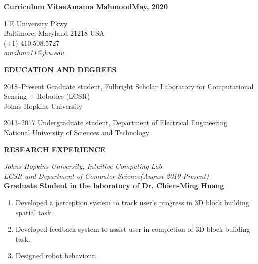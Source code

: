 



\setlength{\parindent}{0pt}

\setlength{\parskip}{6pt}

\frenchspacing

\footnotesize

\textbf{\small Curriculum Vitae\hfill\large Amama Mahmood\hfill\small May, 2020}
\begin{center}
1 E University Pkwy\\
Baltimore, Maryland 21218 USA\\
(+1) 410.508.5727\\
{\color{blue} \ul{\sffamily\textit{amahmo11@jhu.edu}}}
\end{center}

\sffamily

\textbf{EDUCATION AND DEGREES}

\ul{2018--Present} Graduate student, Fulbright Scholar
Laboratory for Computational Sensing $+$ Robotics (LCSR)\\
Johns Hopkins University

\ul{2013--2017} Undergraduate student,
Department of Electrical Engineering
National University of Sciences and Technology


\textbf{RESEARCH EXPERIENCE}

\textit{Johns Hopkins University, Intuitive Computing Lab}\\
\textit{LCSR and Department of Computer Science\hfill(August 2019-Present)}\\
\textbf{\rmfamily Graduate Student in the laboratory of \ul{Dr. Chien-Ming Huang}}

\begin{enumerate}
\item Developed a perception system to track user's progress in 3D block building spatial task.
\item Developed feedback system to assist user in completion of 3D block building task. 
\item Designed robot behaviour.
\end{enumerate}

